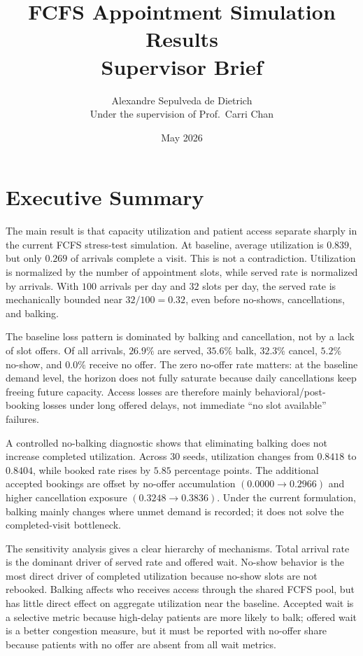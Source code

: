 \documentclass[11pt]{article}
\title{FCFS Appointment Simulation Results\\[0.25em]
\large Supervisor Brief}
\author{Alexandre Sepulveda de Dietrich\\[0.2em]
\small Under the supervision of Prof.\ Carri Chan}
\date{May 2026}
\begin{document}
\maketitle

\section*{Executive Summary}

The main result is that capacity utilization and patient access separate sharply
in the current FCFS stress-test simulation. At baseline, average utilization is
\(0.839\), but only \(0.269\) of arrivals complete a visit. This is not a
contradiction. Utilization is normalized by the number of appointment slots,
while served rate is normalized by arrivals. With \(100\) arrivals per day and
\(32\) slots per day, the served rate is mechanically bounded near
\(32/100=0.32\), even before no-shows, cancellations, and balking.

The baseline loss pattern is dominated by balking and cancellation, not by a
lack of slot offers. Of all arrivals, \(26.9\%\) are served, \(35.6\%\) balk,
\(32.3\%\) cancel, \(5.2\%\) no-show, and \(0.0\%\) receive no offer. The zero
no-offer rate matters: at the baseline demand level, the horizon does not fully
saturate because daily cancellations keep freeing future capacity. Access
losses are therefore mainly behavioral/post-booking losses under long offered
delays, not immediate ``no slot available'' failures.

A controlled no-balking diagnostic shows that eliminating balking does not
increase completed utilization. Across 30 seeds, utilization changes from
\(0.8418\) to \(0.8404\), while booked rate rises by \(5.85\) percentage
points. The additional accepted bookings are offset by no-offer accumulation
\((0.0000 \rightarrow 0.2966)\) and higher cancellation exposure
\((0.3248 \rightarrow 0.3836)\). Under the current formulation, balking mainly
changes where unmet demand is recorded; it does not solve the completed-visit
bottleneck.

The sensitivity analysis gives a clear hierarchy of mechanisms. Total arrival
rate is the dominant driver of served rate and offered wait. No-show behavior
is the most direct driver of completed utilization because no-show slots are
not rebooked. Balking affects who receives access through the shared FCFS pool,
but has little direct effect on aggregate utilization near the baseline.
Accepted wait is a selective metric because high-delay patients are more likely
to balk; offered wait is a better congestion measure, but it must be reported
with no-offer share because patients with no offer are absent from all wait
metrics.
\end{document}
